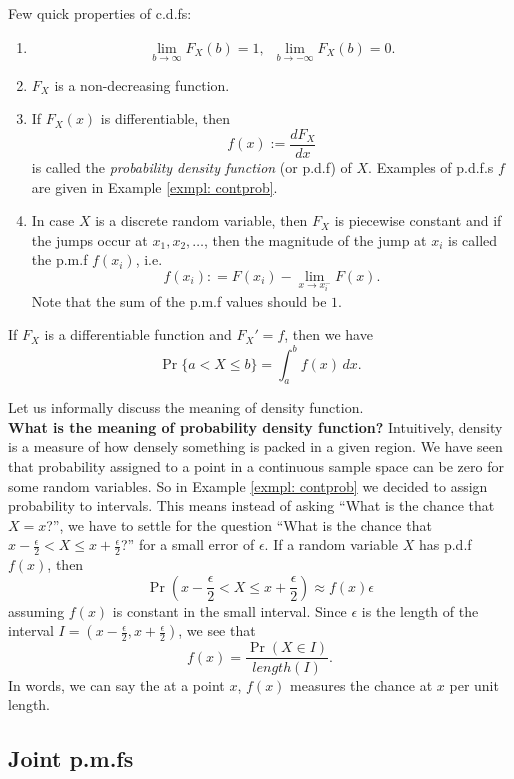 \documentclass[letterpaper, 12pt]{article}
\newcommand{\1}{\mathds{1}} %
\theoremstyle{definition}
\begin{document}
Few quick properties of c.d.fs:
\begin{enumerate}
  \item $$\lim_{b \to \infty} F_X(b)=1, \,\,\,\lim_{b \to -\infty} F_X(b)=0.$$
  \item $F_X$ is a non-decreasing function.
  \item If $F_X(x)$ is differentiable, then \[f(x) := \dfrac{dF_X}{dx}\] is called the \emph{probability density function} (or p.d.f) of $X$. Examples of p.d.f.s $f$ are given in Example \ref{exmpl: contprob}.
  \item In case $X$ is a discrete random variable, then $F_X$ is piecewise constant and if the jumps occur at $x_1,x_2,\ldots$, then the magnitude of the jump at $x_i$ is called the p.m.f $f(x_i)$, i.e. \[f(x_i): = F(x_i) - \lim_{x \to x_i^{-}} F(x).\] Note that the sum of the p.m.f values should be $1$.
\end{enumerate}

If $F_X$ is a differentiable function and $F_X' = f$, then we have \[\Pr\{a < X \leq b\} = \int_a^b f(x)\, dx.\]

Let us informally discuss the meaning of density function. \\
\textbf{What is the meaning of probability density function?} Intuitively, density is a measure of how densely something is packed in a given region. We have seen that probability assigned to a point in a continuous sample space can be zero for some random variables. So in Example \ref{exmpl: contprob} we decided to assign probability to intervals. This means instead of asking ``What is the chance that $X=x$?'', we have to settle for the question ``What is the chance that $x-\frac{\epsilon}{2} < X \leq x+\frac{\epsilon}{2}$?'' for a small error of $\epsilon$. If a random variable $X$ has p.d.f $f(x)$, then \[\Pr(x-\frac{\epsilon}{2} < X \leq x+\frac{\epsilon}{2}) \approx f(x)\epsilon\] assuming $f(x)$ is constant in the small interval. Since $\epsilon$ is the length of the interval $I=(x-\frac{\epsilon}{2},x+\frac{\epsilon}{2})$, we see that \[f(x)=\dfrac{\Pr(X \in I)}{length(I)}.\] In words, we can say the at a point $x$, $f(x)$ measures the chance at $x$ per unit length.

\subsection{Joint p.m.fs}
\end{document}
